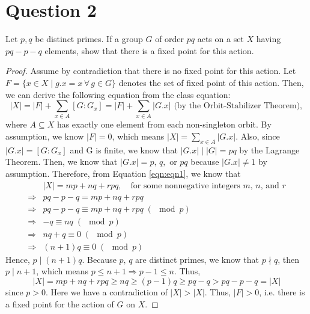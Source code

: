 \section{Question 2}

\begin{question}
    Let $p, q$ be distinct primes. If a group $G$ of order $p q$ acts on a set $X$ having $p q-p-q$ elements, show that there is a fixed point for this action.
\end{question}

\begin{answer}
    \begin{proof}
        Assume by contradiction that there is no fixed point for this action. Let $F = \{x \in X \mid g.x = x \, \forall \, g \in G\}$ denotes the set of fixed point of this action. Then, we can derive the following equation from the class equation:
        \begin{equation}\label{eqn:eqn1}
            \lvert X \rvert = \lvert F \rvert + \sum_{x \in A} [G:G_x] = \lvert F \rvert + \sum_{x \in A} \lvert G.x\rvert \text{ (by the Orbit-Stabilizer Theorem)},
        \end{equation}
        where $A \subseteq X$ has exactly one element from each non-singleton orbit. By assumption, we know $\lvert F \rvert = 0$, which means $\lvert X \rvert = \sum_{x \in A} \lvert G.x \rvert$. Also, since $\lvert G.x \rvert = [G:G_x]$ and G is finite, we know that $\lvert G.x \rvert \mid \lvert G \rvert = pq$ by the Lagrange Theorem. Then, we know that $\lvert G.x \rvert = p,\,q,$ or $pq$ because $\lvert G.x \rvert \neq 1$ by assumption. Therefore, from Equation \ref{eqn:eqn1}, we know that
        \begin{equation}
            \begin{aligned}
                &\lvert X \rvert = mp + nq + rpq, \quad \text{for some nonnegative integers $m$, $n$, and $r$}\\
                \Rightarrow &pq-p-q = mp + nq + rpq\\
                \Rightarrow &pq-p-q \equiv mp + nq + rpq \; (\mod p)\\
                \Rightarrow &-q \equiv nq \; (\mod p)\\
                \Rightarrow &nq+q \equiv 0 \; (\mod p)\\
                \Rightarrow &(n+1)q \equiv 0 \; (\mod p)
            \end{aligned}
        \end{equation}
        Hence, $p \mid (n+1)q$. Because $p,\,q$ are distinct primes, we know that $p \nmid q$, then $p \mid n+1$, which means $p \leq n+1 \Rightarrow p-1 \leq n$. Thus,
        \begin{equation}
            \lvert X \rvert = mp+nq+rpq \geq nq \geq (p-1)q \geq pq - q > pq - p - q = \lvert X \rvert
        \end{equation}
        since $p > 0$. Here we have a contradiction of $\lvert X \rvert > \lvert X \rvert$. Thus, $\lvert F \rvert > 0$, i.e. there is a fixed point for the action of $G$ on $X$.
    \end{proof}
\end{answer}